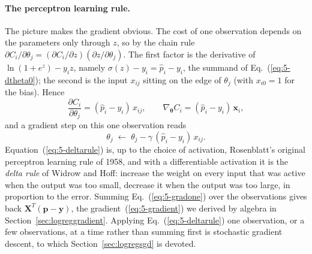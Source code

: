 \paragraph{The perceptron learning rule.}
The picture makes the gradient obvious.  The cost of one observation
depends on the parameters only through $z$, so by the chain rule
$\partial C_i/\partial\theta_j
 =(\partial C_i/\partial z)(\partial z/\partial\theta_j)$.  The first factor
is the derivative of $\ln(1+e^{z})-y_iz$, namely $\sigma(z)-y_i=\hat p_i-y_i$,
the summand of Eq.~(\ref{eq:5-dtheta0}); the second is the input $x_{ij}$
sitting on the edge of $\theta_j$ (with $x_{i0}=1$ for the bias).  Hence
\begin{equation}
  \frac{\partial C_i}{\partial\theta_j} = (\hat p_i-y_i)\,x_{ij},
  \qquad
  \nabla_{\bm{\theta}}C_i = (\hat p_i-y_i)\,\bm{x}_i ,
  \label{eq:5-gradone}
\end{equation}
and a gradient step on this one observation reads
\begin{equation}
  \theta_j \;\leftarrow\; \theta_j - \gamma\,(\hat p_i-y_i)\,x_{ij} .
  \label{eq:5-deltarule}
\end{equation}
Equation~(\ref{eq:5-deltarule}) is, up to the choice of activation,
Rosenblatt's original perceptron learning rule of 1958, and with a
differentiable activation it is the \emph{delta rule} of Widrow and Hoff:
increase the weight on every input that was active when the output was too
small, decrease it when the output was too large, in proportion to the
error.  Summing Eq.~(\ref{eq:5-gradone}) over the observations gives back
$\bm{X}^{T}(\bm{p}-\bm{y})$, the gradient~(\ref{eq:5-gradient}) we
derived by algebra in Section~\ref{sec:logreggradient}.  Applying
Eq.~(\ref{eq:5-deltarule}) one observation, or a few observations, at a
time rather than summing first is stochastic gradient descent, to which
Section~\ref{sec:logregsgd} is devoted.

